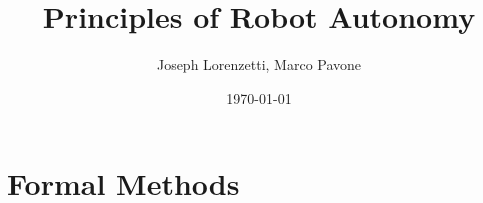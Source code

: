 \documentclass[nohyper,nobib]{tufte-book}
\title{Principles of Robot Autonomy}
\author{Joseph Lorenzetti, Marco Pavone}
\date{\today}
\begin{document}
\chapter{Formal Methods}


\printbibliography
\end{document}
